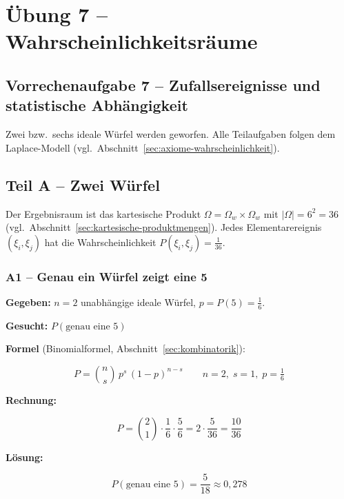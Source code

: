 \section{Übung 7 – Wahrscheinlichkeitsräume}

\subsection*{Vorrechenaufgabe 7 – Zufallsereignisse und statistische Abhängigkeit}

Zwei bzw.\ sechs ideale Würfel werden geworfen. Alle Teilaufgaben folgen dem
Laplace-Modell (vgl.\ Abschnitt~\ref{sec:axiome-wahrscheinlichkeit}).

\subsection*{Teil A – Zwei Würfel}

Der Ergebnisraum ist das kartesische Produkt
$\Omega = \Omega_w \times \Omega_w$ mit $|\Omega| = 6^2 = 36$
(vgl.\ Abschnitt~\ref{sec:kartesische-produktmengen}).
Jedes Elementarereignis $(\xi_i,\xi_j)$ hat die Wahrscheinlichkeit
$P(\xi_i,\xi_j) = \tfrac{1}{36}$.

\subsubsection*{A1 – Genau ein Würfel zeigt eine 5}

\begin{beispiel}

\textbf{Gegeben:} $n = 2$ unabhängige ideale Würfel, $p = P(\text{5}) = \tfrac{1}{6}$.

\textbf{Gesucht:} $P(\text{genau eine 5})$

\textbf{Formel} (Binomialformel, Abschnitt~\ref{sec:kombinatorik}):

$$
P = \binom{n}{s}\,p^{s}\,(1-p)^{n-s}
\qquad n=2,\; s=1,\; p=\tfrac{1}{6}
$$

\textbf{Rechnung:}

$$
P = \binom{2}{1}\cdot\frac{1}{6}\cdot\frac{5}{6}
  = 2 \cdot \frac{5}{36}
  = \frac{10}{36}
$$

\textbf{Lösung:}

$$
\boxed{P(\text{genau eine 5}) = \frac{5}{18} \approx 0{,}278}
$$

\end{beispiel}

